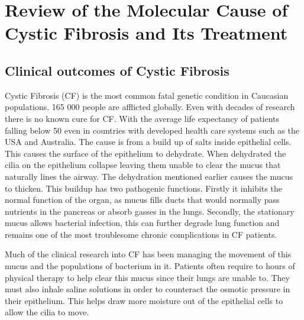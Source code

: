 \chapter{Review of the Molecular Cause of Cystic Fibrosis and Its Treatment}
\label{chap:cftr_review}
\newpage
\section{Clinical outcomes of Cystic Fibrosis}
Cystic Fibrosis (CF) is the most common fatal genetic condition in Caucasian populations. 165 000 people are afflicted globally. Even with decades of research there is no known cure for CF. With the average life expectancy of patients falling below 50 even in countries with developed health care systems such as the USA and Australia\cite{}\cite{}. The cause is from a build up of salts inside epithelial cells. This causes the surface of the epithelium to dehydrate. When dehydrated the cilia on the epithelium collapse leaving them unable to clear the mucus that naturally lines the airway\cite{boucher2007}. The dehydration mentioned earlier causes the mucus to thicken. This buildup has two pathogenic functions. Firstly it inhibits the normal function of the organ, as mucus fills ducts that would normally pass nutrients in the pancreas or absorb gasses in the lungs. Secondly, the stationary mucus allows bacterial infection, this can further degrade lung function and remains one of the most troublesome chronic complications in CF patients. 

Much of the clinical research into CF has been managing the movement of this mucus and the populations of bacterium in it. Patients often require to hours of physical therapy to help clear this mucus since their lungs are unable to. They must also inhale saline solutions in order to counteract the osmotic pressure in their epithelium. This helps draw more moisture out of the epithelial cells to allow the cilia to move. 

